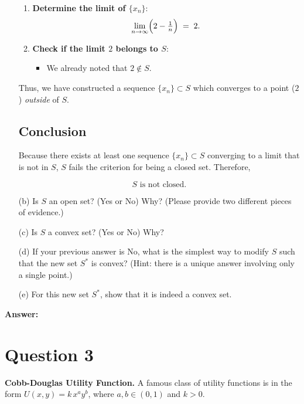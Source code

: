 \documentclass[12pt]{article}
\begin{document}
\begin{enumerate}
\begin{enumerate}
        \item \textbf{Determine the limit of \( \{x_n\} \)}:  
        \[
        \lim_{n \to \infty} \Bigl(2 - \tfrac{1}{n}\Bigr) \;=\; 2.
        \]
        
        \item \textbf{Check if the limit \( 2 \) belongs to \( S \)}:  
        \begin{itemize}
            \item We already noted that \( 2 \notin S \).
        \end{itemize}
    \end{enumerate}
    
    Thus, we have constructed a sequence \( \{x_n\} \subset S \) which converges to a point (\( 2 \)) \textit{outside} of \( S \).
    
    \hrulefill
    
    \subsection*{Conclusion}
    
    Because there exists at least one sequence \( \{x_n\} \subset S \) converging to a limit that is not in \( S \), \( S \) fails the criterion for being a closed set. Therefore,
    
    \[
    \boxed{ S \text{ is not closed.} }
    \]
    \item[(b)] Is \(S\) an open set? (Yes or No) Why? (Please provide two different pieces of evidence.)
    \item[(c)] Is \(S\) a convex set? (Yes or No) Why?
    \item[(d)] If your previous answer is No, what is the simplest way to modify \(S\) such that the new set \(S^*\) is convex? (Hint: there is a unique answer involving only a single point.)
    \item[(e)] For this new set \(S^*\), show that it is indeed a convex set.
\end{enumerate}

\noindent \textbf{Answer:}
\vspace{3cm}

\newpage

\section*{Question 3}
\textbf{Cobb-Douglas Utility Function.} A famous class of utility functions is in the form \(U(x, y) = k \, x^a y^b\), where \(a, b \in (0, 1)\) and \(k > 0\).
\end{document}
